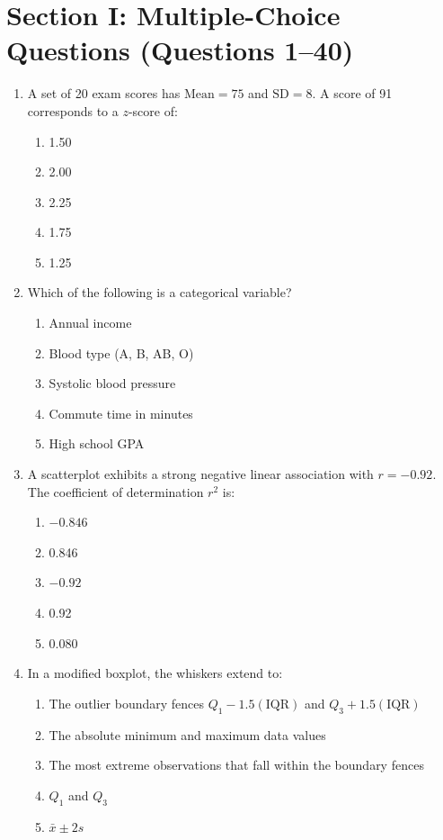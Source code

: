 \section{Section I: Multiple-Choice Questions (Questions 1--40)}
\begin{enumerate}[leftmargin=1.5em]
  \item A set of 20 exam scores has $\text{Mean} = 75$ and $\text{SD} = 8$. A score of 91 corresponds to a $z$-score of:
  \begin{enumerate}[label=(\Alph*)]
    \item 1.50 \item 2.00 \item 2.25 \item 1.75 \item 1.25
  \end{enumerate}

  \item Which of the following is a categorical variable?
  \begin{enumerate}[label=(\Alph*)]
    \item Annual income \item Blood type (A, B, AB, O) \item Systolic blood pressure \item Commute time in minutes \item High school GPA
  \end{enumerate}

  \item A scatterplot exhibits a strong negative linear association with $r = -0.92$. The coefficient of determination $r^2$ is:
  \begin{enumerate}[label=(\Alph*)]
    \item $-0.846$ \item 0.846 \item $-0.92$ \item 0.92 \item 0.080
  \end{enumerate}

  \item In a modified boxplot, the whiskers extend to:
  \begin{enumerate}[label=(\Alph*)]
    \item The outlier boundary fences $Q_1 - 1.5(\text{IQR})$ and $Q_3 + 1.5(\text{IQR})$
    \item The absolute minimum and maximum data values
    \item The most extreme observations that fall within the boundary fences
    \item $Q_1$ and $Q_3$
    \item $\bar{x} \pm 2s$
  \end{enumerate}


\end{enumerate}
